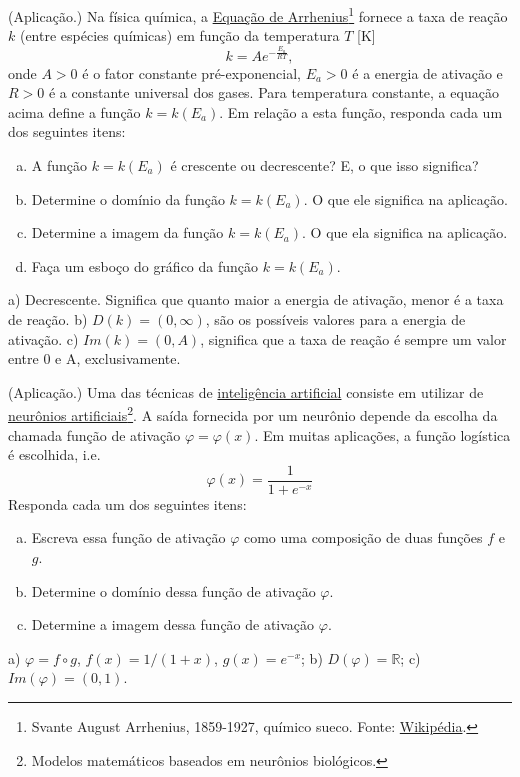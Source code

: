\begin{exer}(Aplicação.)
  Na física química, a \href{https://pt.wikipedia.org/wiki/Equa\%C3\%A7\%C3\%A3o\_de\_Arrhenius}{Equação de Arrhenius}\footnote{Svante August Arrhenius, 1859-1927, químico sueco. Fonte: \href{https://pt.wikipedia.org/wiki/Svante\_Arrhenius}{Wikipédia}.} fornece a taxa de reação $k$ (entre espécies químicas) em função da temperatura $T$ [K]
  \begin{equation}
    k = Ae^{-\frac{E_a}{RT}}, 
  \end{equation}
  onde $A>0$ é o fator constante pré-exponencial, $E_a>0$ é a energia de ativação e $R>0$ é a constante universal dos gases. Para temperatura constante, a equação acima define a função $k = k(E_a)$. Em relação a esta função, responda cada um dos seguintes itens:
  \begin{enumerate}[a)]
  \item A função $k = k(E_a)$ é crescente ou decrescente? E, o que isso significa?
  \item Determine o domínio da função $k = k(E_a)$. O que ele significa na aplicação.
  \item Determine a imagem da função $k = k(E_a)$. O que ela significa na aplicação.
  \item Faça um esboço do gráfico da função $k = k(E_a)$.
  \end{enumerate}
\end{exer}
\begin{resp}
  a) Decrescente. Significa que quanto maior a energia de ativação, menor é a taxa de reação. b) $D(k) = (0,\infty)$, são os possíveis valores para a energia de ativação. c) $Im(k) = (0,A)$, significa que a taxa de reação é sempre um valor entre 0 e A, exclusivamente.
\end{resp}

\begin{exer}(Aplicação.)
  Uma das técnicas de \href{https://pt.wikipedia.org/wiki/Intelig\%C3\%AAncia\_artificial}{inteligência artificial} consiste em utilizar de \href{https://en.wikipedia.org/wiki/Artificial\_neuron}{neurônios artificiais}\footnote{Modelos matemáticos baseados em neurônios biológicos.}. A saída fornecida por um neurônio depende da escolha da chamada função de ativação $\varphi = \varphi(x)$. Em muitas aplicações, a função logística é escolhida, i.e.
  \begin{equation}
    \varphi(x) = \frac{1}{1 + e^{-x}}
  \end{equation}
  Responda cada um dos seguintes itens:
  \begin{enumerate}[a)]
  \item Escreva essa função de ativação $\varphi$ como uma composição de duas funções $f$ e $g$.
  \item Determine o domínio dessa função de ativação $\varphi$.
  \item Determine a imagem dessa função de ativação $\varphi$.
  \end{enumerate}
\end{exer}
\begin{resp}
  a) $\varphi = f\circ g$, $f(x) = 1/(1+x)$, $g(x) = e^{-x}$; b) $D(\varphi) = \mathbb{R}$; c) $Im(\varphi) = (0,1)$.
\end{resp}

